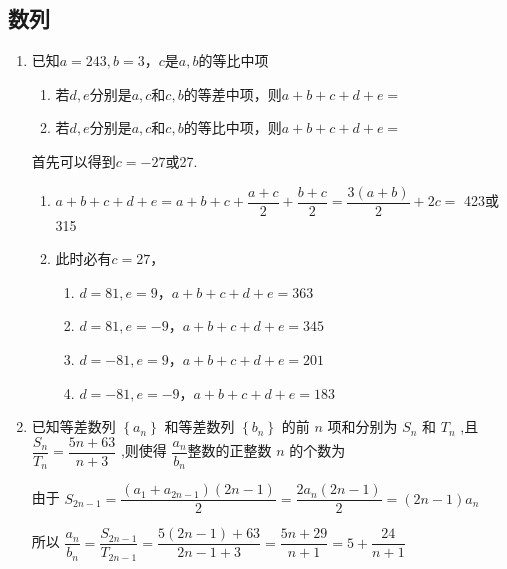 \subsection*{数列}
\begin{enumerate}
    \item 已知$a = 243, b = 3$，$c$是$a, b$的等比中项
    \begin{enumerate}
        \item 若$d, e$分别是$a, c$和$c, b$的等差中项，则$a+b+c+d+e = $
        \item 若$d, e$分别是$a, c$和$c, b$的等比中项，则$a+b+c+d+e = $
    \end{enumerate}
    \begin{jieda}
        首先可以得到$c = -27$或27.
        \begin{enumerate}
            \item $a+b+c+d+e = a+b+c + \dfrac{a+c}{2} + \dfrac{b+c}{2} = \dfrac{3(a+b)}{2} + 2c = $ 423或315
            \item 此时必有$c = 27$，\begin{enumerate}[1.]
                \item $d = 81, e = 9$，$a+b+c+d+e = 363$
                \item $d = 81, e = -9$，$a+b+c+d+e = 345$
                \item $d = -81, e = 9$，$a+b+c+d+e = 201$
                \item $d = -81, e = -9$，$a+b+c+d+e = 183$
            \end{enumerate}
        \end{enumerate}
    \end{jieda}
    \item 已知等差数列 $\left\{  {a}_{n}\right\}$ 和等差数列 $\left\{  {b}_{n}\right\}$ 的前 $n$ 项和分别为 ${S}_{n}$ 和 ${T}_{n}$ ,且 $\dfrac{{S}_{n}}{T_n} = \dfrac{{5n} + {63}}{n + 3}$ ,则使得 $\dfrac{a_n}{b_n}$整数的正整数 $n$ 的个数为 
    \begin{jieda}
        由于 ${S}_{{2n} - 1} = \dfrac{\left( {{a}_{1} + {a}_{{2n} - 1}}\right) \left( {{2n} - 1}\right) }{2} = \dfrac{2{a}_{n}\left( {{2n} - 1}\right) }{2} = \left( {{2n} - 1}\right) {a}_{n}$
        
        所以 $\dfrac{{a}_{n}}{{b}_{n}} = \dfrac{{S}_{{2n} - 1}}{{T}_{{2n} - 1}} = \dfrac{5\left( {{2n} - 1}\right)  + {63}}{{2n} - 1 + 3} = \dfrac{{5n} + {29}}{n + 1} = 5 + \dfrac{24}{n + 1}$ 
        

\end{jieda}
\end{enumerate}
